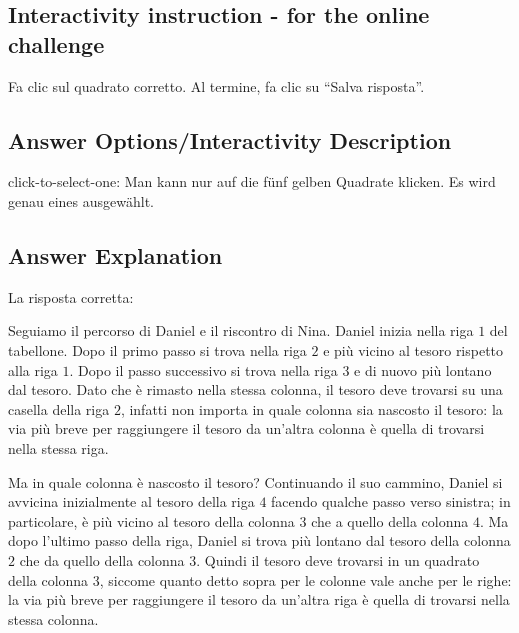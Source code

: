 \documentclass[a4paper,11pt]{report}
\newcommand{\taskGraphicsFolder}{..}
\begin{document}
\subsection*{Interactivity instruction - for the online challenge}

Fa clic sul quadrato corretto. Al termine, fa clic su \enquote{Salva risposta}.

\begingroup
\renewcommand{\arraystretch}{1.5}
\subsection*{Answer Options/Interactivity Description}

click-to-select-one:  Man kann nur auf die fünf gelben Quadrate klicken. Es wird genau eines ausgewählt.

\endgroup

\subsection*{Answer Explanation}

La risposta corretta:

{\centering%
\par}

Seguiamo il percorso di Daniel e il riscontro di Nina. Daniel inizia nella riga $1$ del tabellone. Dopo il primo passo si trova nella riga $2$ e più vicino al tesoro rispetto alla riga $1$. Dopo il passo successivo si trova nella riga $3$ e di nuovo più lontano dal tesoro. Dato che è rimasto nella stessa colonna, il tesoro deve trovarsi su una casella della riga $2$, infatti non importa in quale colonna sia nascosto il tesoro: la via più breve per raggiungere il tesoro da un’altra colonna è quella di trovarsi nella stessa riga.

Ma in quale colonna è nascosto il tesoro? Continuando il suo cammino, Daniel si avvicina inizialmente al tesoro della riga $4$ facendo qualche passo verso sinistra; in particolare, è più vicino al tesoro della colonna $3$ che a quello della colonna $4$. Ma dopo l’ultimo passo della riga, Daniel si trova più lontano dal tesoro della colonna $2$ che da quello della colonna $3$. Quindi il tesoro deve trovarsi in un quadrato della colonna $3$, siccome quanto detto sopra per le colonne vale anche per le righe: la via più breve per raggiungere il tesoro da un’altra riga è quella di trovarsi nella stessa colonna.
\end{document}
